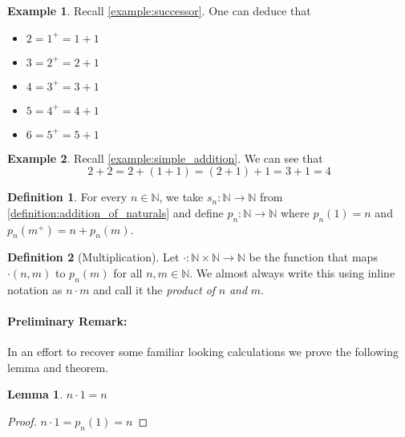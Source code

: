 \documentclass{article}
\theoremstyle{definition}
\newtheorem{definition}{Definition}[section]
\theoremstyle{definition}
\newtheorem{example}{Example}[section]
\theoremstyle{plain}
\theoremstyle{remark}
\theoremstyle{plain}
\theoremstyle{remark}
\theoremstyle{plain}
\newtheorem{lemma}{Lemma}[section]
\theoremstyle{plain}
\theoremstyle{plain}
\theoremstyle{plain}
\begin{document}
\begin{example}
  Recall \autoref{example:successor}. 
  One can deduce that 
  \begin{itemize}
    \item \(2 = 1^{+} = 1 + 1 \)
    \item \(3 = 2^{+} = 2 + 1 \)
    \item \(4 = 3^{+} = 3 + 1\)
    \item \(5 = 4^{+} = 4 + 1\)
    \item \(6 = 5^{+} = 5 + 1 \)
  \end{itemize}
  \label{example:simple_addition}
\end{example}

\begin{example}
  Recall \autoref{example:simple_addition}. We can see that 
  \[ 2 + 2 = 2 + (1 + 1) = (2 + 1) + 1 = 3 + 1 = 4 \]
  \label{example:two_plus_two}
\end{example}

\begin{definition}
  For every \( n \in \mathbb{N} \), we take 
  \(s_n: \mathbb{N} \rightarrow \mathbb{N} \) from 
  \autoref{definition:addition_of_naturals} and define 
  \( p_n: \mathbb{N} \rightarrow \mathbb{N} \) where 
  \( p_n(1) = n \) and \( p_n(m^{+}) = n + p_n(m) \). 
  \label{definition:primitive_multiplication_of_naturals}
\end{definition}

\begin{definition}[Multiplication]
  Let \( \cdot : \mathbb{N} \times \mathbb{N} \rightarrow \mathbb{N} \) be the 
  function that maps \( \cdot(n, m) \) to \( p_n(m) \) for all 
  \( n, m \in \mathbb{N} \). 
  We almost always write this using inline notation as \( n \cdot m \) and call 
  it the \textit{product of} \( n \) \textit{and} \(m\). 
  \label{definition:multiplication_of_naturals}
\end{definition}

\paragraph{Preliminary Remark:}
In an effort to recover some familiar looking calculations we prove the 
following lemma and theorem.

\begin{lemma}
  \( n \cdot 1 = n \)
  \label{lemma:n_times_one}
\end{lemma}

\begin{proof}
  \( n \cdot 1 = p_n(1) = n \)
\end{proof}
\end{document}
